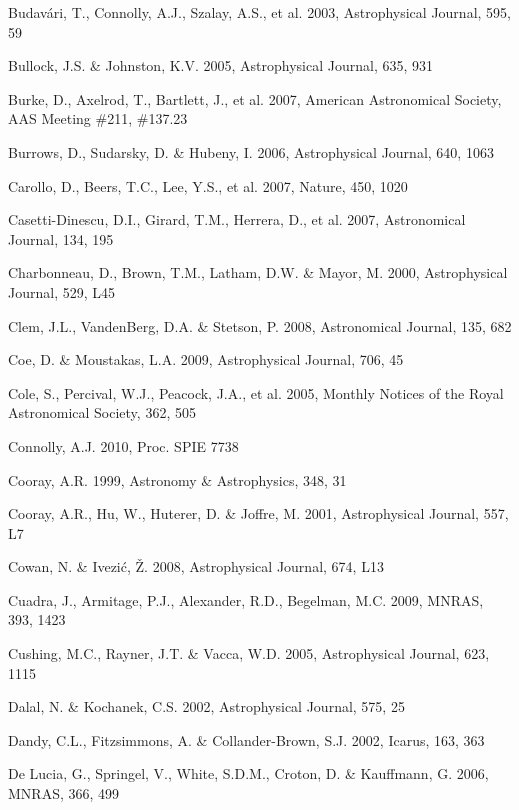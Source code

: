 \documentclass{emulateapj}
\begin{document}
\begin{thebibliography}{}
\bibitem[()]{} Budav\'{a}ri, T., Connolly, A.J., Szalay, A.S., et al. 2003, Astrophysical Journal, 595, 59

\bibitem[()]{} Bullock, J.S. \& Johnston, K.V. 2005,  Astrophysical Journal, 635, 931

\bibitem[()]{} Burke, D., Axelrod, T., Bartlett, J., et al. 2007, 
             American Astronomical Society, AAS Meeting \#211, \#137.23

\bibitem[()]{} Burrows, D., Sudarsky, D. \& Hubeny, I. 2006, Astrophysical Journal, 640, 1063

\bibitem[()]{} Carollo, D., Beers, T.C., Lee, Y.S., et al. 2007, Nature, 450, 1020	

\bibitem[()]{} Casetti-Dinescu, D.I., Girard, T.M., Herrera, D., et al. 2007, Astronomical 
             Journal, 134, 195
	
\bibitem[()]{} Charbonneau, D., Brown, T.M., Latham, D.W. \& Mayor, M. 2000, Astrophysical 
             Journal, 529, L45

\bibitem[()]{} Clem, J.L., VandenBerg, D.A. \& Stetson, P. 2008, Astronomical Journal, 135, 682

\bibitem[()]{} Coe, D. \& Moustakas, L.A. 2009, Astrophysical Journal, 706, 45 

\bibitem[()]{} Cole, S., Percival, W.J., Peacock, J.A., et al. 2005, Monthly Notices of the Royal 
             Astronomical Society, 362, 505

\bibitem[()]{} Connolly, A.J. 2010, Proc. SPIE 7738

\bibitem[()]{} Cooray, A.R. 1999, Astronomy \& Astrophysics, 348, 31
	
\bibitem[()]{} Cooray, A.R., Hu, W., Huterer, D. \& Joffre, M. 2001, Astrophysical Journal, 557, L7 

\bibitem[()]{} Cowan, N. \& Ivezi\'{c}, \v{Z}. 2008, Astrophysical Journal, 674, L13

\bibitem[()]{} Cuadra, J., Armitage, P.J., Alexander, R.D., Begelman, M.C. 2009, MNRAS, 393, 1423 

\bibitem[()]{} Cushing, M.C., Rayner, J.T. \& Vacca, W.D. 2005, Astrophysical Journal, 623, 1115

\bibitem[()]{} Dalal, N. \& Kochanek, C.S. 2002, Astrophysical Journal, 575, 25

\bibitem[()]{} Dandy, C.L., Fitzsimmons, A. \& Collander-Brown, S.J. 2002, Icarus, 163, 363  

\bibitem[()]{} De Lucia, G., Springel, V., White, S.D.M., Croton, D. \& Kauffmann, G. 2006, MNRAS, 366, 499
	

\end{thebibliography}
\end{document}
